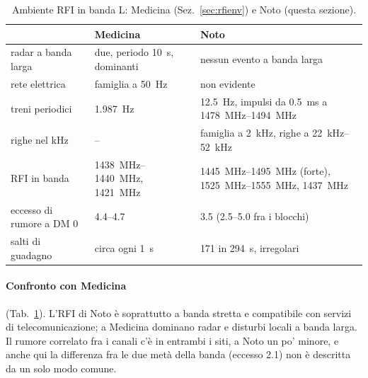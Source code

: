 \begin{table}[ht]
\centering
\caption{Ambiente RFI in banda L: Medicina (Sez.~\ref{sec:rfienv}) e Noto (questa sezione).}
\label{tab:notoenv}
\small
\begin{tabular}{p{4.2cm}p{4.6cm}p{5.4cm}}
\toprule
 & Medicina & Noto \\
\midrule
radar a banda larga & due, periodo \SI{10}{\second}, dominanti & nessun evento a banda larga \\
rete elettrica & famiglia a \SI{50}{\hertz} & non evidente \\
treni periodici & \SI{1.987}{\hertz} & \SI{12.5}{\hertz}, impulsi da \SI{0.5}{\milli\second} a \SIrange{1478}{1494}{\mega\hertz} \\
righe nel kHz & -- & famiglia a \SI{2}{\kilo\hertz}, righe a \SIrange{22}{52}{\kilo\hertz} \\
RFI in banda & \SIrange{1438}{1440}{\mega\hertz}, \SI{1421}{\mega\hertz} & \SIrange{1445}{1495}{\mega\hertz} (forte),
  \SIrange{1525}{1555}{\mega\hertz}, \SI{1437}{\mega\hertz} \\
eccesso di rumore a DM 0 & 4.4--4.7 & 3.5 (2.5--5.0 fra i blocchi) \\
salti di guadagno & circa ogni \SI{1}{\second} & 171 in \SI{294}{\second}, irregolari \\
\bottomrule
\end{tabular}
\end{table}

\paragraph{Confronto con Medicina} (Tab.~\ref{tab:notoenv}). L'RFI di Noto è soprattutto a banda stretta e
compatibile con servizi di telecomunicazione; a Medicina dominano radar e disturbi locali a banda larga. Il rumore
correlato fra i canali c'è in entrambi i siti, a Noto un po' minore, e anche qui la differenza fra le due metà della
banda (eccesso 2.1) non è descritta da un solo modo comune.


